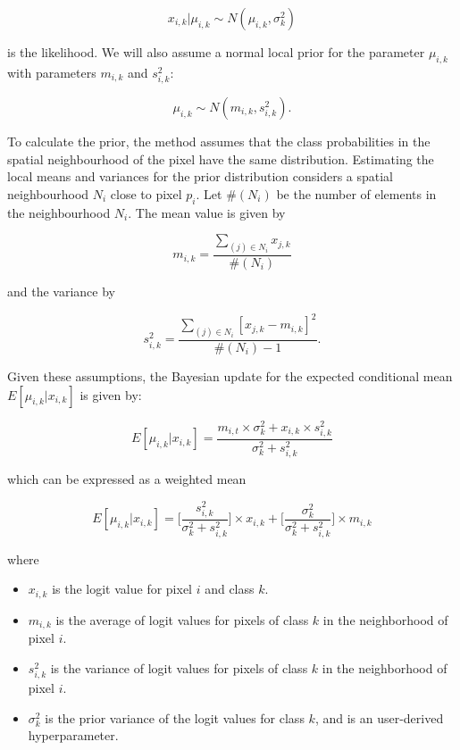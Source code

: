 \documentclass[
]{jss}
\begin{document}
\begin{equation}
x_{i,k} | \mu_{i,k} \sim N(\mu_{i,k}, \sigma^2_{k})
\end{equation}

is the likelihood. We will also assume a normal local prior for the
parameter \(\mu_{i,k}\) with parameters \(m_{i,k}\) and \(s^2_{i,k}\):

\begin{equation}
    \mu_{i,k} \sim N(m_{i,k}, s^2_{i,k}).
\end{equation}

To calculate the prior, the method assumes that the class probabilities in the spatial
neighbourhood of the pixel have the same distribution. Estimating the local means and variances
for the prior distribution considers a spatial neighbourhood \(N_{i}\) close to pixel \(p_i\).
Let \(\#(N_{i})\) be the number of elements in the neighbourhood \(N_{i}\).
The mean value is given by

\begin{equation}
m_{i,k} = \frac{\sum_{(j) \in N_{i}} x_{j,k}}{\#(N_{i})}
\end{equation}

and the variance by

\begin{equation}
s^2_{i,k} = \frac{\sum_{(j) \in N_{i}} [x_{j,k} - m_{i,k}]^2}{\#(N_{i})-1}.
\end{equation}

Given these assumptions, the Bayesian update for the expected conditional mean
\({E}[\mu_{i,k} | x_{i,k}]\) is given by:

\begin{equation}
{E}[\mu_{i,k} | x_{i,k}] = \frac{m_{i,t} \times \sigma^2_{k} +
x_{i,k} \times s^2_{i,k}}{ \sigma^2_{k} +s^2_{i,k}}
\end{equation}

which can be expressed as a weighted mean

\begin{equation}
{E}[\mu_{i,k} | x_{i,k}] =
\Biggl [ \frac{s^2_{i,k}}{\sigma^2_{k} +s^2_{i,k}} \Biggr ] \times
x_{i,k} +
\Biggl [ \frac{\sigma^2_{k}}{\sigma^2_{k} +s^2_{i,k}} \Biggr ] \times m_{i,k}
\end{equation}

where

\begin{itemize}
\item $x_{i,k}$ is the logit value for pixel $i$ and class $k$.
\item $m_{i,k}$ is the average of logit values for pixels of class $k$ 
in the neighborhood of pixel $i$.
\item $s^2_{i,k}$ is the variance of logit values for pixels of class $k$ 
in the neighborhood of pixel $i$.
\item $\sigma^2_{k}$ is the prior variance of the logit values for class $k$, 
and is an user-derived hyperparameter.
\end{itemize}
\end{document}
